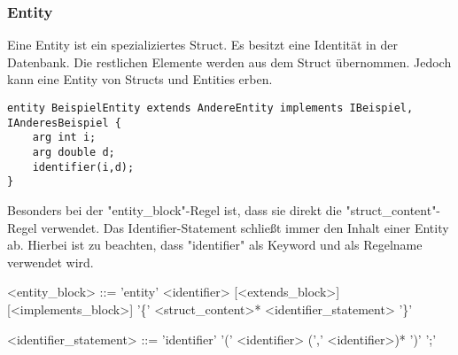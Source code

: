 \documentclass[./einleitung.tex]{subfiles}
\begin{document}
\subsubsection{Entity}
Eine Entity ist ein spezializiertes Struct. Es besitzt eine Identität in der Datenbank. Die restlichen Elemente werden aus dem Struct übernommen. Jedoch kann eine Entity von Structs und Entities erben.
\begin{lstlisting}
entity BeispielEntity extends AndereEntity implements IBeispiel, IAnderesBeispiel {
    arg int i;
    arg double d;
    identifier(i,d);
}
\end{lstlisting}
Besonders bei der "entity_block"-Regel ist, dass sie direkt die "struct_content"-Regel verwendet. Das Identifier-Statement schließt immer den Inhalt einer Entity ab. Hierbei ist zu beachten, dass "identifier" als Keyword und als Regelname verwendet wird.
\begin{grammar}
<entity_block> ::= 'entity' <identifier> [<extends_block>] [<implements_block>] '\{' <struct_content>* <identifier_statement> '\}' 

<identifier_statement> ::= 'identifier' '(' <identifier> (',' <identifier>)* ')' ';'
\end{grammar}





\end{document}
